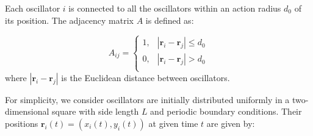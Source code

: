 \documentclass[%
 aip,
 amsmath,amssymb,
 reprint,%
]{revtex4-1}
\begin{document}
Each oscillator $i$ is connected to all the oscillators within an
action radius $d_0$ of its position. The adjacency matrix $A$ is defined as:

\begin{equation}
    A_{ij}=\begin{cases}
        1,&		\left| \mathbf{r}_i-\mathbf{r}_j \right|\le d_0\\
        0,&		\left| \mathbf{r}_i-\mathbf{r}_j \right|>d_0\\
    \end{cases}
\end{equation}
where $\left| \mathbf{r}_i-\mathbf{r}_j \right|$ is the Euclidean distance between oscillators. 

For simplicity, we consider oscillators are initially distributed uniformly in a two-dimensional square with side length $L$ and periodic boundary conditions. Their positions $\mathbf{r}_i\left( t \right) =\left( x_i\left( t \right) ,y_i\left( t \right) \right) $ at given time $t$ are given by:
\end{document}
